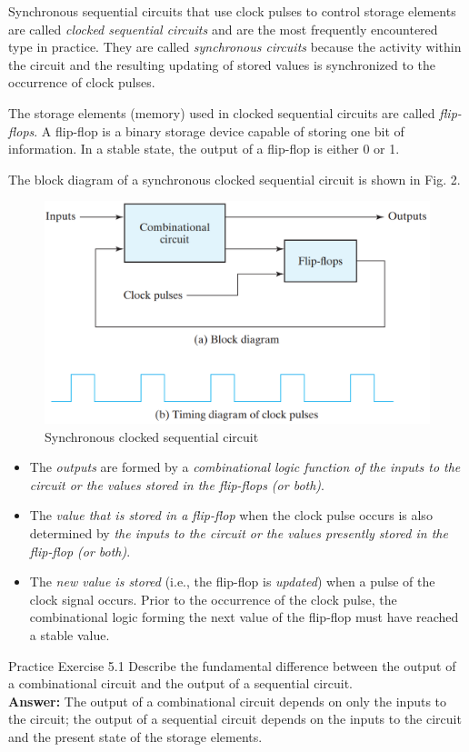 Synchronous sequential circuits that use clock pulses to control storage elements are called \textit{clocked sequential circuits} and are the most 
frequently encountered type in practice. They are called \textit{synchronous circuits} because the activity within the circuit and the resulting updating of stored values is synchronized to the occurrence of clock pulses.

The storage elements (memory) used in clocked sequential circuits are called \textit{flip-flops}. A flip-flop is a binary storage device capable of storing one bit of information. In a stable state, the output of a flip-flop is either 0 or 1.

The block diagram of a synchronous clocked sequential circuit is shown in  Fig. 2. 
\begin{figure}[H]
  \centering
  \includegraphics[width=\linewidth]{img/fig-5.2.png}
  \caption{Synchronous clocked sequential circuit}
  \label{fig:5.2}
\end{figure}

\begin{itemize}
  \item The \textit{outputs} are formed by a \textit{combinational logic function of the inputs to the circuit or the values stored in the flip-flops (or both)}. 
  \item The \textit{value that is stored in a flip-flop} when the clock pulse occurs is also determined by \textit{the inputs to the circuit or the values presently stored in the flip-flop (or both)}.
  \item The \textit{new value is stored} (i.e., the flip-flop is \textit{updated}) when a pulse of the clock signal occurs. Prior to the occurrence of the clock pulse, the combinational logic forming the next value of the flip-flop must have reached a stable value.
\end{itemize}

\begin{practice}{Practice Exercise 5.1}
Describe the fundamental difference between the output of a combinational circuit and the output of a sequential circuit. \\

\textbf{Answer:} 
The output of a combinational circuit depends on only the inputs to the circuit; the output of a sequential circuit depends on the inputs to the circuit and the present state of the storage elements.
\end{practice}
